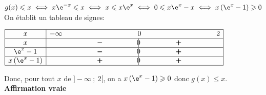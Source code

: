 $g(x) \leqslant x \iff x\e^{-x} \leqslant x \iff x \leqslant x\e^{x} \iff 0 \leqslant x\e^{x}-x \iff x\left (\e^{x}-1\right )\geqslant 0$\\

On établit un tableau de signes:
\begin{center}
	{%
		\def\esp{\hspace*{3cm}}
		$\begin{array}{|c | *{5}{c} |} 
			\hline
			x  & -\infty & \esp & 0 & \esp  & 2 \\
			\hline
			x &  & \pmb{-} &  \vline\hspace{-2.7pt}{0} & \pmb{+} &   \\
			\hline
			\e^{x}-1 &  & \pmb{-} &  \vline\hspace{-2.7pt}{0} & \pmb{+} &   \\
			\hline
			x\left (\e^{x}-1\right ) &  & \pmb{+} &  \vline\hspace{-2.7pt}{0} & \pmb{+} &   \\
			\hline
		\end{array}$
	}
\end{center}
Donc, pour tout $x$ de $] - \infty~;~2[$, on a $x\left (\e^{x}-1\right ) \geqslant 0$ donc $g(x) \leqslant x$.\\
\textbf{Affirmation vraie}